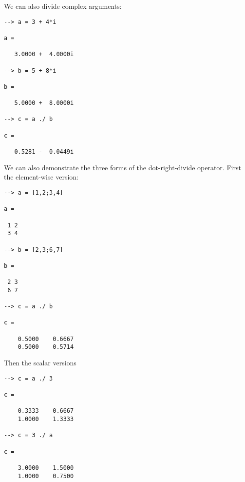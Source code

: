We can also divide complex arguments:
\begin{verbatim}
--> a = 3 + 4*i

a = 

   3.0000 +  4.0000i 

--> b = 5 + 8*i

b = 

   5.0000 +  8.0000i 

--> c = a ./ b

c = 

   0.5281 -  0.0449i 
\end{verbatim}
We can also demonstrate the three forms of the dot-right-divide operator.  First
the element-wise version:
\begin{verbatim}
--> a = [1,2;3,4]

a = 

 1 2 
 3 4 

--> b = [2,3;6,7]

b = 

 2 3 
 6 7 

--> c = a ./ b

c = 

    0.5000    0.6667 
    0.5000    0.5714 
\end{verbatim}
Then the scalar versions
\begin{verbatim}
--> c = a ./ 3

c = 

    0.3333    0.6667 
    1.0000    1.3333 

--> c = 3 ./ a

c = 

    3.0000    1.5000 
    1.0000    0.7500 
\end{verbatim}
